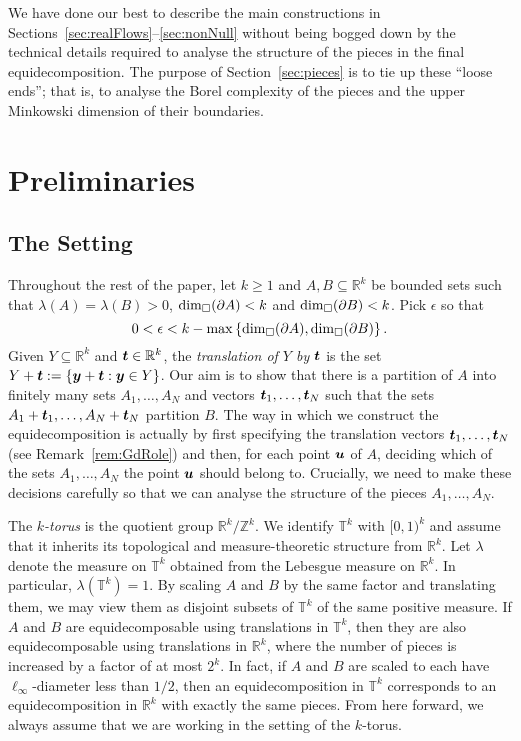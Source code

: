 \documentclass[12pt,a4paper]{amsart}
\numberwithin{equation}{section}
\theoremstyle{definition}
\begin{document}
We have done our best to describe the main constructions in Sections~\ref{sec:realFlows}--\ref{sec:nonNull} without being bogged down by the technical details required to analyse the structure of the pieces in the final equidecomposition. The purpose of Section~\ref{sec:pieces}  is to tie up these ``loose ends''; that is, to analyse the Borel complexity of the pieces and the upper Minkowski dimension of their boundaries. 
\section{Preliminaries}
\label{sec:prelim}

\subsection{The Setting}
\label{subsec:setting}

Throughout the rest of the paper, let $k\geq1$ and  $A,B\subseteq \mathbb{R}^k$ be bounded sets such that $\lambda(A)=\lambda(B)>0$, $\operatorname{dim}_\square(\partial A)< k$ and $\operatorname{dim}_\square(\partial B)< k$. Pick $\epsilon$ so that
\begin{equation}
\label{eq:epsilonGap}
0<\epsilon< k-\max\left\{\operatorname{dim}_\square(\partial A),\operatorname{dim}_\square(\partial B)\right\}.
\end{equation} 
Given $Y\subseteq\mathbb{R}^k$ and $\boldsymbol{t}\in \mathbb{R}^k$, the \emph{translation of $Y$ by $\boldsymbol{t}$} is the set $Y+\boldsymbol{t}:=\left\{\boldsymbol{y}+\boldsymbol{t}: \boldsymbol{y}\in Y\right\}$. Our aim is to show that there is a partition of $A$ into finitely many sets $A_1,\dots,A_N$ and vectors $\boldsymbol{t}_1,\dots,\boldsymbol{t}_N$ such that the sets $A_1+\boldsymbol{t}_1,\dots,A_N+\boldsymbol{t}_N$ partition $B$. The way in which we construct the equidecomposition is actually by first specifying the translation vectors $\boldsymbol{t}_1,\dots,\boldsymbol{t}_N$ (see Remark~\ref{rem:GdRole}) and then, for each point $\boldsymbol{u}$ of $A$, deciding which of the sets $A_1,\dots,A_N$ the point $\boldsymbol{u}$ should belong to. Crucially, we need to make these decisions carefully so that we can analyse the structure of the pieces $A_1,\dots,A_N$. 

The \emph{$k$-torus} is the quotient group $\mathbb{R}^k/\mathbb{Z}^k$. We identify $\mathbb{T}^k$ with $[0,1)^k$ and assume that it inherits its topological and measure-theoretic structure from $\mathbb{R}^k$. Let $\lambda$ denote the measure on $\mathbb{T}^k$ obtained from the Lebesgue measure on $\mathbb{R}^k$. In particular, $\lambda\left(\mathbb{T}^k\right)=1$.  By scaling $A$ and $B$ by the same factor and translating them, we may view them as disjoint subsets of $\mathbb{T}^k$ of the same positive measure. If $A$ and $B$ are equidecomposable using translations in $\mathbb{T}^k$, then they are also equidecomposable using translations in $\mathbb{R}^k$, where the number of pieces is increased by a factor of at most $2^k$. In fact, if $A$ and $B$ are scaled to each have $\ell_\infty$-diameter less than $1/2$, then an equidecomposition in $\mathbb{T}^k$ corresponds to an equidecomposition in $\mathbb{R}^k$ with exactly the same pieces. From here forward, we always assume that we are working in the setting of the $k$-torus. 
\end{document}
